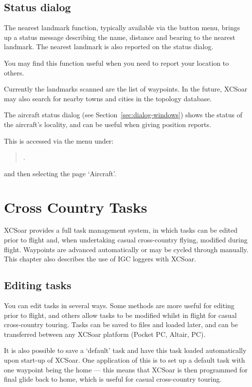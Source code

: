 \documentclass[a4paper,12pt]{refrep}
\begin{document}
\section{Status dialog}\label{sec:aircr-stat-dial}

The nearest landmark function, typically available via the button
menu, brings up a status message describing the name, distance and
bearing to the nearest landmark.  The nearest landmark is also
reported on the status dialog.

You may find this function useful when you need to report your
location to others.

Currently the landmarks scanned are the list of waypoints.  In the
future, XCSoar may also search for nearby towns and cities in the
topology database.

The aircraft status dialog (see Section~\ref{sec:dialog-windows})
shows the status of the aircraft's locality, and can be useful when
giving position reports.

This is accessed via the menu under: 
\begin{quote}
\blink{}.
\end{quote}
and then selecting the page `Aircraft'.

\chapter{Cross Country Tasks}\label{cha:tasks}

XCSoar provides a full task management system, in which tasks can be
edited prior to flight and, when undertaking casual cross-country
flying, modified during flight.  Waypoints are advanced automatically
or may be cycled through manually.  This chapter also describes the
use of IGC loggers with XCSoar.

\section{Editing tasks}

You can edit tasks in several ways.  Some methods are more useful for
editing prior to flight, and others allow tasks to be modified whilst
in flight for casual cross-country touring.  Tasks can be saved to
files and loaded later, and can be transferred between any XCSoar
platform (Pocket PC, Altair, PC).

\tip It is also possible to save a `default' task and have this task loaded
automatically upon start-up of XCSoar.  One application of this is to
set up a default task with one waypoint being the home --- this means
that XCSoar is then programmed for final glide back to home, which is
useful for casual cross-country touring.
\end{document}
